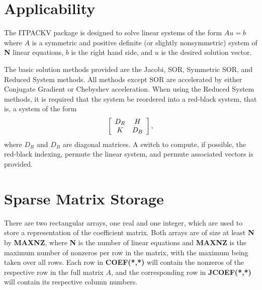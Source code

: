 \section{Applicability}
\label{apply}
 
The ITPACKV package is designed to solve linear systems of the form
$Au=b$ where $A$ is a symmetric and positive definite (or slightly
nonsymmetric) system of {\bf N} linear equations, $b$ is the right hand 
side, and $u$ is the desired solution vector.
 
The basic solution methods provided are the Jacobi, SOR, Symmetric
SOR, and Reduced System methods.  All methods except SOR are
accelerated by either Conjugate Gradient or Chebyshev acceleration.
When using the Reduced System methods, it is required that the system
be reordered into a red-black system, that is, a system of the form
\[ \left[ \begin{array}{cc} D_R & H \\ K & D_B \end{array} \right], \]
where $D_R$ and $D_B$ are diagonal matrices.  A switch to compute,
if possible, the red-black indexing, permute the linear system, and
permute associated vectors is provided.
 
\section{Sparse Matrix Storage}
\label{storage} 
 
There are two rectangular arrays, one real and one integer, which are
used to store a representation of the coefficient matrix.  Both arrays
are of size at least {\bf N} by {\bf MAXNZ}, where {\bf N} is the number of 
linear equations and {\bf MAXNZ} is the maximum number of nonzeros per 
row in the matrix, with the maximum being taken over all rows.  Each row 
in {\bf COEF(*,*)} will contain the nonzeros of the respective row in 
the full matrix $A$, and the corresponding row in {\bf JCOEF(*,*)} will 
contain its respective column numbers. 
 
